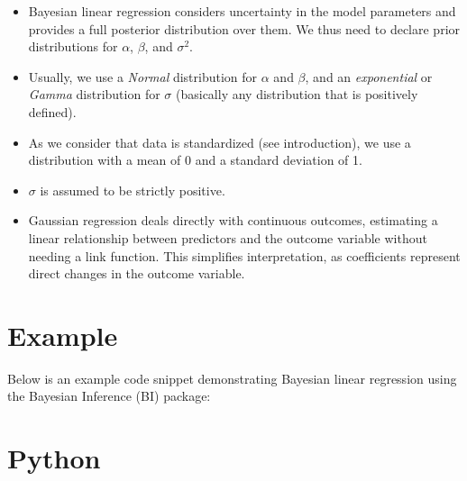 \documentclass[
  letterpaper,
  DIV=11,
  numbers=noendperiod]{scrreprt}
\begin{document}
\begin{tcolorbox}[enhanced jigsaw, toptitle=1mm, opacityback=0, titlerule=0mm, breakable, bottomrule=.15mm, colframe=quarto-callout-caution-color-frame, arc=.35mm, coltitle=black, left=2mm, opacitybacktitle=0.6, leftrule=.75mm, toprule=.15mm, rightrule=.15mm, bottomtitle=1mm, colbacktitle=quarto-callout-caution-color!10!white, title=\textcolor{quarto-callout-caution-color}{\faFire}\hspace{0.5em}{Caution}, colback=white]

\begin{itemize}
\item
  Bayesian linear regression considers uncertainty in the model
  parameters and provides a full posterior distribution over them. We
  thus need to declare prior distributions for \(\alpha\), \(\beta\),
  and \(\sigma^2\).
\item
  Usually, we use a \emph{Normal} distribution for \(\alpha\) and
  \(\beta\), and an \emph{exponential} or \emph{Gamma} distribution for
  \(\sigma\) (basically any distribution that is positively defined).
\item
  As we consider that data is standardized (see introduction), we use a
  distribution with a mean of 0 and a standard deviation of 1.
\item
  \(\sigma\) is assumed to be strictly positive.
\item
  Gaussian regression deals directly with continuous outcomes,
  estimating a linear relationship between predictors and the outcome
  variable without needing a link function. This simplifies
  interpretation, as coefficients represent direct changes in the
  outcome variable.
\end{itemize}

\end{tcolorbox}

\section{Example}\label{example}

Below is an example code snippet demonstrating Bayesian linear
regression using the Bayesian Inference (BI) package:

\section{Python}
\end{document}
